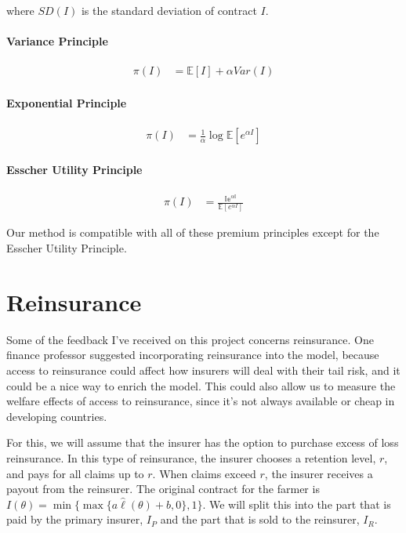 \documentclass[11pt]{article}
\begin{document}
    where $SD(I)$ is the standard deviation of contract $I$. 

  \paragraph*{Variance Principle}
    \begin{align*}
        \pi(I) &= \mathbb{E}[I] + \alpha Var(I)
    \end{align*}

    \paragraph*{Exponential Principle}
    \begin{align*}
        \pi(I) &= \frac{1}{\alpha} \log \mathbb{E}[e^{\alpha I}]
    \end{align*}

    \paragraph*{Esscher Utility Principle}
    \begin{align*}
        \pi(I) &= \frac{\mathbb{I e^{\alpha I}}}{\mathbb{E}[e^{\alpha I}]} 
    \end{align*}

    Our method is compatible with all of these premium principles except for the Esscher Utility Principle. 

  
\section{Reinsurance}
  Some of the feedback I've received on this project concerns reinsurance. One finance professor suggested incorporating reinsurance into the model, because access to reinsurance could affect how insurers will deal with their tail risk, and it could be a nice way to enrich the model. This could also allow us to measure the welfare effects of access to reinsurance, since it's not always available or cheap in developing countries. 

  For this, we will assume that the insurer has the option to purchase excess of loss reinsurance. In this type of reinsurance, the insurer chooses a retention level, $r$, and pays for all claims up to $r$. When claims exceed $r$, the insurer receives a payout from the reinsurer. The original contract for the farmer is $I(\theta) = \min \{ \max \{a\hat{\ell}(\theta) + b, 0 \},1 \}$. We will split this into the part that is paid by the primary insurer, $I_P$ and the part that is sold to the reinsurer, $I_R$.
\end{document}
